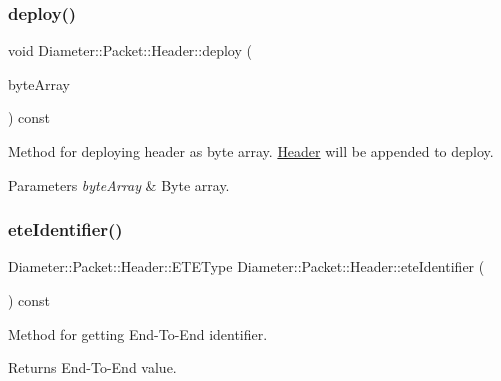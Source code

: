 \subsubsection{\texorpdfstring{deploy()}{deploy()}\hspace{0.1cm}{\footnotesize\ttfamily [2/2]}}
{\footnotesize\ttfamily void Diameter\+::\+Packet\+::\+Header\+::deploy (\begin{DoxyParamCaption}\item[{Byte\+Array \&}]{byte\+Array }\end{DoxyParamCaption}) const}



Method for deploying header as byte array. \hyperlink{classDiameter_1_1Packet_1_1Header}{Header} will be appended to deploy. 


\begin{DoxyParams}{Parameters}
{\em byte\+Array} & Byte array. \\
\hline
\end{DoxyParams}
\mbox{\label{classDiameter_1_1Packet_1_1Header_a9e2c00f1ef8ed89a7b4810005c33fa6e}} 
\subsubsection{\texorpdfstring{ete\+Identifier()}{eteIdentifier()}\hspace{0.1cm}{\footnotesize\ttfamily [1/2]}}
{\footnotesize\ttfamily Diameter\+::\+Packet\+::\+Header\+::\+E\+T\+E\+Type Diameter\+::\+Packet\+::\+Header\+::ete\+Identifier (\begin{DoxyParamCaption}{ }\end{DoxyParamCaption}) const}



Method for getting End-\/\+To-\/\+End identifier. 

\begin{DoxyReturn}{Returns}
End-\/\+To-\/\+End value. 
\end{DoxyReturn}
\mbox{\label{classDiameter_1_1Packet_1_1Header_a7c560309887342069e4c8cd5548e7259}} 
